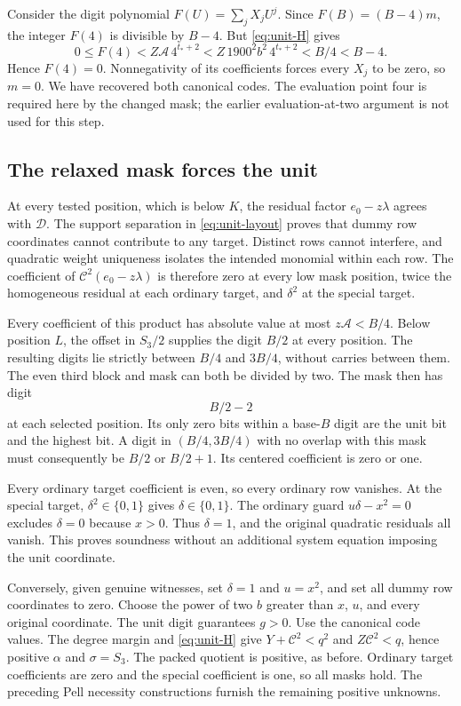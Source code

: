 Consider the digit polynomial $F(U)=\sum_jX_jU^j$.
Since $F(B)=(B-4)m$, the integer $F(4)$ is divisible by $B-4$.
But \eqref{eq:unit-H} gives
\[
 0\le F(4)<Z\mathcal A\,4^{t_*+2}
       <Z\,1900^2b^2\,4^{t_*+2}<B/4<B-4.
\]
Hence $F(4)=0$. Nonnegativity of its coefficients forces every $X_j$
to be zero, so $m=0$. We have recovered both canonical codes.
The evaluation point four is required here by the changed mask;
the earlier evaluation-at-two argument is not used for this step.

\subsection{The relaxed mask forces the unit}

At every tested position, which is below $K$, the residual factor
$e_0-z\lambda$ agrees with $\mathcal D$. The support separation
in \eqref{eq:unit-layout} proves that dummy row coordinates cannot
contribute to any target. Distinct rows cannot interfere, and
quadratic weight uniqueness isolates the intended monomial within
each row. The coefficient of
$\mathcal C^2(e_0-z\lambda)$ is therefore zero at every low mask
position, twice the homogeneous residual at each ordinary target,
and $\delta^2$ at the special target.

Every coefficient of this product has absolute value at most
$z\mathcal A<B/4$. Below position $L$, the offset in $S_3/2$
supplies the digit $B/2$ at every position. The resulting digits
lie strictly between $B/4$ and $3B/4$, without carries between them.
The even third block and mask can both be divided by two. The mask
then has digit
\[
 B/2-2
\]
at each selected position. Its only zero bits within a base-$B$
digit are the unit bit and the highest bit. A digit in
$(B/4,3B/4)$ with no overlap with this mask must consequently be
$B/2$ or $B/2+1$. Its centered coefficient is zero or one.

Every ordinary target coefficient is even, so every ordinary row
vanishes. At the special target, $\delta^2\in\{0,1\}$ gives
$\delta\in\{0,1\}$. The ordinary guard $u\delta-x^2=0$ excludes
$\delta=0$ because $x>0$. Thus $\delta=1$, and the original quadratic
residuals all vanish. This proves soundness without an additional
system equation imposing the unit coordinate.

Conversely, given genuine witnesses, set $\delta=1$ and $u=x^2$,
and set all dummy row coordinates to zero. Choose the power of two
$b$ greater than $x$, $u$, and every original coordinate. The unit
digit guarantees $g>0$. Use the canonical code values. The degree
margin and \eqref{eq:unit-H} give
$Y+\mathcal C^2<q^2$ and $Z\mathcal C^2<q$, hence positive
$\alpha$ and $\sigma=S_3$. The packed quotient is positive, as
before. Ordinary target coefficients are zero and the special
coefficient is one, so all masks hold. The preceding Pell necessity
constructions furnish the remaining positive unknowns.

